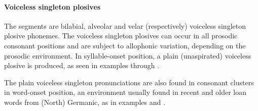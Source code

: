 \paragraph{Voiceless singleton plosives}\label{ptk}
The segments  are bilabial, alveolar and velar (respectively) voiceless singleton plosive phonemes. %
The voiceless singleton plosives can occur in all prosodic consonant positions and are subject to allophonic variation, depending on the prosodic environment. In syllable-onset position, a plain (unaspirated) voiceless plosive \ipa{[p\,t\,k]} is produced, as seen in examples  through . %

The plain voiceless singleton pronunciations \ipa{[p\,t\,k]} %
are also found in consonant clusters in word-onset position, an environment usually found in recent and older loan words from (North) Germanic, as in examples  %
and . %
\clearpage
\vspace{-1em}

